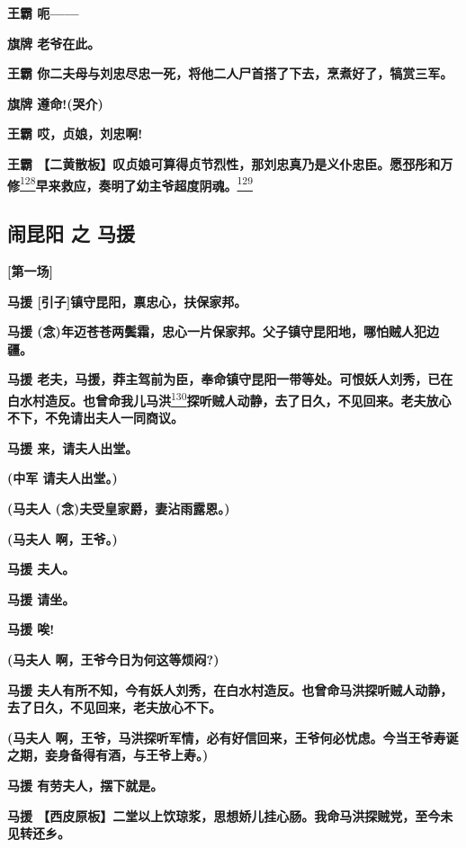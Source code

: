 \textbf{王霸 呃------}

\textbf{旗牌 老爷在此。}

\textbf{王霸
你二夫母与刘忠尽忠一死，将他二人尸首搭了下去，烹煮好了，犒赏三军。}

\textbf{旗牌 遵命!(哭介)}

\textbf{王霸 哎，贞娘，刘忠啊!}

\textbf{王霸
【二黄散板】叹贞娘可算得贞节烈性，那刘忠真乃是义仆忠臣。愿邳彤和万修}\protect\hyperlink{fn128}{\textsuperscript{128}}\textbf{早来救应，奏明了幼主爷超度阴魂。}\protect\hyperlink{fn129}{\textsuperscript{129}}

\newpage
\hypertarget{ux95f9ux6606ux9633-ux4e4b-ux9a6cux63f4}{%
\subsection{闹昆阳 之
马援}\label{ux95f9ux6606ux9633-ux4e4b-ux9a6cux63f4}}

\textbf{{[}第一场{]}}

\textbf{马援 {[}引子{]}镇守昆阳，禀忠心，扶保家邦。}

\textbf{马援
(念)年迈苍苍两鬓霜，忠心一片保家邦。父子镇守昆阳地，哪怕贼人犯边疆。}

\textbf{马援
老夫，马援，莽主驾前为臣，奉命镇守昆阳一带等处。可恨妖人刘秀，已在白水村造反。也曾命我儿马洪}\protect\hyperlink{fn130}{\textsuperscript{130}}\textbf{探听贼人动静，去了日久，不见回来。老夫放心不下，不免请出夫人一同商议。}

\textbf{马援 来，请夫人出堂。}

\textbf{(中军 请夫人出堂。)}

\textbf{(马夫人 (念)夫受皇家爵，妻沾雨露恩。)}

\textbf{(马夫人 啊，王爷。)}

\textbf{马援 夫人。}

\textbf{马援 请坐。}

\textbf{马援 唉!}

\textbf{(马夫人 啊，王爷今日为何这等烦闷?)}

\textbf{马援
夫人有所不知，今有妖人刘秀，在白水村造反。也曾命马洪探听贼人动静，去了日久，不见回来，老夫放心不下。}

\textbf{(马夫人
啊，王爷，马洪探听军情，必有好信回来，王爷何必忧虑。今当王爷寿诞之期，妾身备得有酒，与王爷上寿。)}

\textbf{马援 有劳夫人，摆下就是。}

\textbf{马援
【西皮原板】二堂以上饮琼浆，思想娇儿挂心肠。我命马洪探贼党，至今未见转还乡。}

